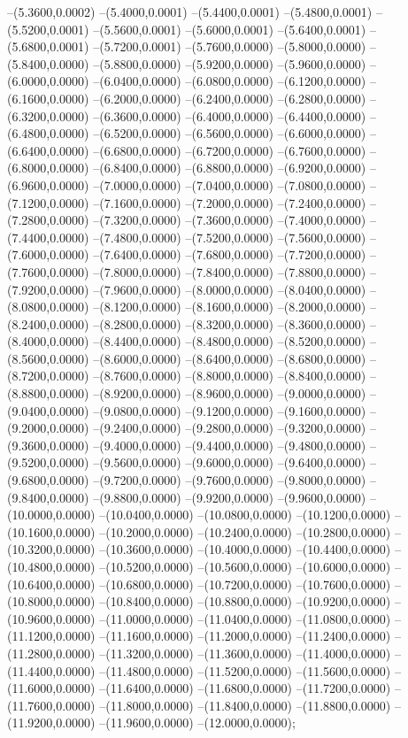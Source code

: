{	--(5.3600,0.0002)
	--(5.4000,0.0001)
	--(5.4400,0.0001)
	--(5.4800,0.0001)
	--(5.5200,0.0001)
	--(5.5600,0.0001)
	--(5.6000,0.0001)
	--(5.6400,0.0001)
	--(5.6800,0.0001)
	--(5.7200,0.0001)
	--(5.7600,0.0000)
	--(5.8000,0.0000)
	--(5.8400,0.0000)
	--(5.8800,0.0000)
	--(5.9200,0.0000)
	--(5.9600,0.0000)
	--(6.0000,0.0000)
	--(6.0400,0.0000)
	--(6.0800,0.0000)
	--(6.1200,0.0000)
	--(6.1600,0.0000)
	--(6.2000,0.0000)
	--(6.2400,0.0000)
	--(6.2800,0.0000)
	--(6.3200,0.0000)
	--(6.3600,0.0000)
	--(6.4000,0.0000)
	--(6.4400,0.0000)
	--(6.4800,0.0000)
	--(6.5200,0.0000)
	--(6.5600,0.0000)
	--(6.6000,0.0000)
	--(6.6400,0.0000)
	--(6.6800,0.0000)
	--(6.7200,0.0000)
	--(6.7600,0.0000)
	--(6.8000,0.0000)
	--(6.8400,0.0000)
	--(6.8800,0.0000)
	--(6.9200,0.0000)
	--(6.9600,0.0000)
	--(7.0000,0.0000)
	--(7.0400,0.0000)
	--(7.0800,0.0000)
	--(7.1200,0.0000)
	--(7.1600,0.0000)
	--(7.2000,0.0000)
	--(7.2400,0.0000)
	--(7.2800,0.0000)
	--(7.3200,0.0000)
	--(7.3600,0.0000)
	--(7.4000,0.0000)
	--(7.4400,0.0000)
	--(7.4800,0.0000)
	--(7.5200,0.0000)
	--(7.5600,0.0000)
	--(7.6000,0.0000)
	--(7.6400,0.0000)
	--(7.6800,0.0000)
	--(7.7200,0.0000)
	--(7.7600,0.0000)
	--(7.8000,0.0000)
	--(7.8400,0.0000)
	--(7.8800,0.0000)
	--(7.9200,0.0000)
	--(7.9600,0.0000)
	--(8.0000,0.0000)
	--(8.0400,0.0000)
	--(8.0800,0.0000)
	--(8.1200,0.0000)
	--(8.1600,0.0000)
	--(8.2000,0.0000)
	--(8.2400,0.0000)
	--(8.2800,0.0000)
	--(8.3200,0.0000)
	--(8.3600,0.0000)
	--(8.4000,0.0000)
	--(8.4400,0.0000)
	--(8.4800,0.0000)
	--(8.5200,0.0000)
	--(8.5600,0.0000)
	--(8.6000,0.0000)
	--(8.6400,0.0000)
	--(8.6800,0.0000)
	--(8.7200,0.0000)
	--(8.7600,0.0000)
	--(8.8000,0.0000)
	--(8.8400,0.0000)
	--(8.8800,0.0000)
	--(8.9200,0.0000)
	--(8.9600,0.0000)
	--(9.0000,0.0000)
	--(9.0400,0.0000)
	--(9.0800,0.0000)
	--(9.1200,0.0000)
	--(9.1600,0.0000)
	--(9.2000,0.0000)
	--(9.2400,0.0000)
	--(9.2800,0.0000)
	--(9.3200,0.0000)
	--(9.3600,0.0000)
	--(9.4000,0.0000)
	--(9.4400,0.0000)
	--(9.4800,0.0000)
	--(9.5200,0.0000)
	--(9.5600,0.0000)
	--(9.6000,0.0000)
	--(9.6400,0.0000)
	--(9.6800,0.0000)
	--(9.7200,0.0000)
	--(9.7600,0.0000)
	--(9.8000,0.0000)
	--(9.8400,0.0000)
	--(9.8800,0.0000)
	--(9.9200,0.0000)
	--(9.9600,0.0000)
	--(10.0000,0.0000)
	--(10.0400,0.0000)
	--(10.0800,0.0000)
	--(10.1200,0.0000)
	--(10.1600,0.0000)
	--(10.2000,0.0000)
	--(10.2400,0.0000)
	--(10.2800,0.0000)
	--(10.3200,0.0000)
	--(10.3600,0.0000)
	--(10.4000,0.0000)
	--(10.4400,0.0000)
	--(10.4800,0.0000)
	--(10.5200,0.0000)
	--(10.5600,0.0000)
	--(10.6000,0.0000)
	--(10.6400,0.0000)
	--(10.6800,0.0000)
	--(10.7200,0.0000)
	--(10.7600,0.0000)
	--(10.8000,0.0000)
	--(10.8400,0.0000)
	--(10.8800,0.0000)
	--(10.9200,0.0000)
	--(10.9600,0.0000)
	--(11.0000,0.0000)
	--(11.0400,0.0000)
	--(11.0800,0.0000)
	--(11.1200,0.0000)
	--(11.1600,0.0000)
	--(11.2000,0.0000)
	--(11.2400,0.0000)
	--(11.2800,0.0000)
	--(11.3200,0.0000)
	--(11.3600,0.0000)
	--(11.4000,0.0000)
	--(11.4400,0.0000)
	--(11.4800,0.0000)
	--(11.5200,0.0000)
	--(11.5600,0.0000)
	--(11.6000,0.0000)
	--(11.6400,0.0000)
	--(11.6800,0.0000)
	--(11.7200,0.0000)
	--(11.7600,0.0000)
	--(11.8000,0.0000)
	--(11.8400,0.0000)
	--(11.8800,0.0000)
	--(11.9200,0.0000)
	--(11.9600,0.0000)
	--(12.0000,0.0000);
}
